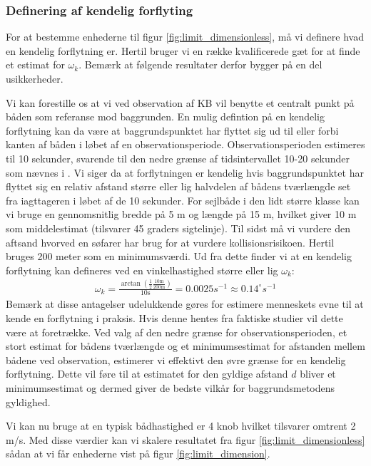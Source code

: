 \documentclass[%
 reprint,
nofootinbib,
aps,
]{revtex4-1}
\begin{document}
\subsubsection{Definering af kendelig forflyting}
For at bestemme enhederne til figur \ref{fig:limit_dimensionless}, må vi definere hvad en kendelig forflytning er. Hertil bruger vi en række kvalificerede gæt for at finde et estimat for $\omega_k$. Bemærk at følgende resultater derfor bygger på en del usikkerheder. \par
Vi kan forestille os at vi ved observation af KB vil benytte et centralt punkt på båden som referanse mod baggrunden. En mulig defintion på en kendelig forflytning kan da være at baggrundspunktet har flyttet sig ud til eller forbi kanten af båden i løbet af en observationsperiode. Observationsperioden estimeres til 10 sekunder, svarende til den nedre grænse af tidsintervallet 10-20 sekunder som nævnes i \cite{duelighed}. Vi siger da at forflytningen er kendelig hvis baggrundspunktet har flyttet sig en relativ afstand større eller lig halvdelen af bådens tværlængde set fra iagttageren i løbet af de 10 sekunder. For sejlbåde i den lidt større klasse kan vi bruge en gennomsnitlig bredde på 5 m og længde på 15 m, hvilket giver 10 m som middelestimat (tilsvarer 45 graders sigtelinje). Til sidst må vi vurdere den aftsand hvorved en søfarer har brug for at vurdere kollisionsrisikoen. Hertil bruges 200 meter som en minimumsværdi. Ud fra dette finder vi at en kendelig forflytning kan defineres ved en vinkelhastighed større eller lig $\omega_k$:
\begin{align}
  \omega_k = \frac{\arctan{(\frac{1}{2}\frac{10 \text{m}}{200 \text{m}})}}{10 \text{s}} = 0.0025 s^{-1} \approx  0.14^{\circ}s^{-1}
  \label{eq:omega_k}
\end{align}
Bemærk at disse antagelser udelukkende gøres for estimere menneskets evne til at kende en forflytning i praksis. Hvis denne hentes fra faktiske studier vil dette være at foretrække. Ved valg af den nedre grænse for observationsperioden, et stort estimat for bådens tværlængde og et minimumsestimat for afstanden mellem bådene ved observation, estimerer vi effektivt den øvre grænse for en kendelig forflytning. Dette vil føre til at estimatet for den gyldige afstand $d$ bliver et minimumsestimat og dermed giver de bedste vilkår for baggrundsmetodens gyldighed. \par
Vi kan nu bruge at en typisk bådhastighed er 4 knob hvilket tilsvarer omtrent 2 m/s. Med disse værdier kan vi skalere resultatet fra figur \ref{fig:limit_dimensionless} sådan at vi får enhederne vist på figur \ref{fig:limit_dimension}.
\end{document}
